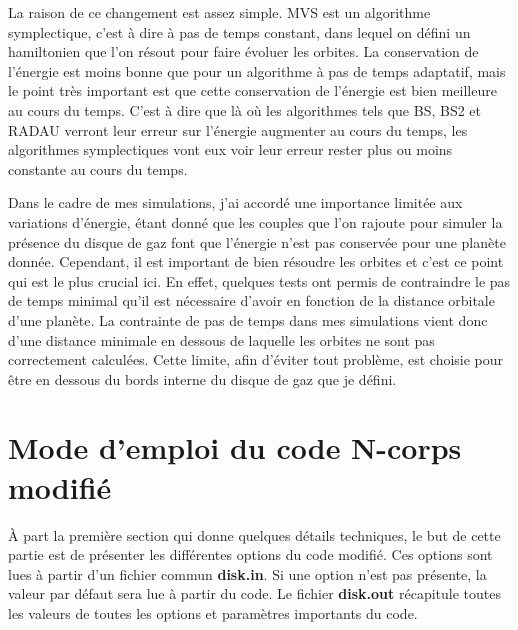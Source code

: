 La raison de ce changement est assez simple. MVS est un algorithme symplectique, c'est à dire à pas de temps constant, dans lequel on défini un hamiltonien que l'on résout pour faire évoluer les orbites. La conservation de l'énergie est moins bonne que pour un algorithme à pas de temps adaptatif, mais le point très important est que cette conservation de l'énergie est bien meilleure au cours du temps. C'est à dire que là où les algorithmes tels que BS, BS2 et RADAU verront leur erreur sur l'énergie augmenter au cours du temps, les algorithmes symplectiques vont eux voir leur erreur rester plus ou moins constante au cours du temps. 

Dans le cadre de mes simulations, j'ai accordé une importance limitée aux variations d'énergie, étant donné que les couples que l'on rajoute pour simuler la présence du disque de gaz font que l'énergie n'est pas conservée pour une planète donnée. Cependant, il est important de bien résoudre les orbites et c'est ce point qui est le plus crucial ici. En effet, quelques tests ont permis de contraindre le pas de temps minimal qu'il est nécessaire d'avoir en fonction de la distance orbitale d'une planète. La contrainte de pas de temps dans mes simulations vient donc d'une distance minimale en dessous de laquelle les orbites ne sont pas correctement calculées. Cette limite, afin d'éviter tout problème, est choisie pour être en dessous du bords interne du disque de gaz que je défini.



\section{Mode d'emploi du code N-corps modifié}
À part la première section qui donne quelques détails techniques, le but de cette partie est de présenter les différentes options du code modifié. Ces options sont lues à partir d'un fichier commun \textbf{disk.in}. Si une option n'est pas présente, la valeur par défaut sera lue à partir du code. Le fichier \textbf{disk.out} récapitule toutes les valeurs de toutes les options et paramètres importants du code. 

